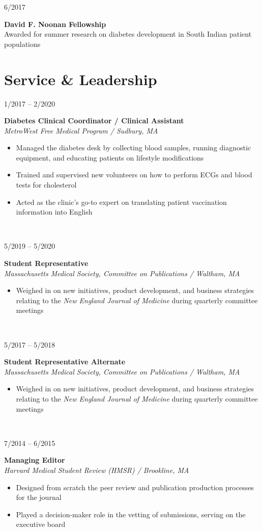 \documentclass{book}
\newcommand{\entryvspace}{\vspace{0.5em}}
\newcommand\colleft{.20}
\newcommand\colright{.75}
\newcommand{\entryfour}[4]
{
	\begin{minipage}[t]{\colleft\textwidth}
		\hfill \textsc{#1}
	\end{minipage}
	\hfill\vline\hfill
	\begin{minipage}[t]{\colright\textwidth}
		{\bf#2}\\
		\textit{#3}
		\footnotesize{#4}
	\end{minipage}\\
	\entryvspace
}%
\newcommand{\entrythree}[3]
{
	\begin{minipage}[t]{\colleft\textwidth}
		\hfill \textsc{#1}
	\end{minipage}    
	\hfill\vline\hfill
	\begin{minipage}[t]{\colright\textwidth}
		{\bf#2}\\
		\footnotesize{#3}
	\end{minipage}
	\entryvspace
}%
\begin{document}
		\entrythree{6/2017}{David F. Noonan Fellowship}{Awarded for summer research on diabetes development in South Indian patient populations}
	\section*{Service \& Leadership}
	\entryfour{1/2017 -- 2/2020}{Diabetes Clinical Coordinator / Clinical Assistant}{MetroWest Free Medical Program / Sudbury, MA}{%
	\begin{itemize}
		\item Managed the diabetes desk by collecting blood samples, running diagnostic equipment, and educating patients on lifestyle modifications
		\item Trained and supervised new volunteers on how to perform ECGs and blood tests for cholesterol 
		\item Acted as the clinic's go-to expert on translating patient vaccination information into English
	\end{itemize}
	}

	\entryfour{5/2019 -- 5/2020}{Student Representative}{Massachusetts Medical Society, Committee on Publications / Waltham, MA}{%
		\begin{itemize}
			\item Weighed in on new initiatives, product development, and business strategies relating to the \emph{New England Journal of Medicine} during quarterly committee meetings
		\end{itemize}
	}

	\entryfour{5/2017 -- 5/2018}{Student Representative Alternate}{Massachusetts Medical Society, Committee on Publications / Waltham, MA}{%
	\begin{itemize}
		\item Weighed in on new initiatives, product development, and business strategies relating to the \emph{New England Journal of Medicine} during quarterly committee meetings
	\end{itemize}
}

	\entryfour{7/2014 -- 6/2015}{Managing Editor}{Harvard Medical Student Review (HMSR) / Brookline, MA}{%
	\begin{itemize}
		\item Designed from scratch the peer review and publication production processes for the journal
		\item Played a decision-maker role in the vetting of submissions, serving on the executive board
	\end{itemize}
	}
\end{document}
